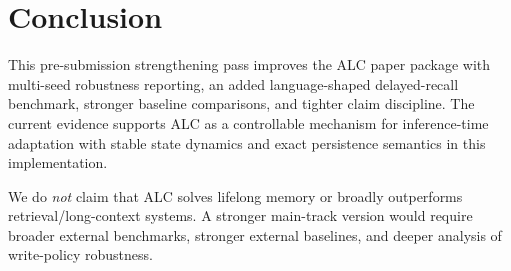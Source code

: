 \section{Conclusion}
This pre-submission strengthening pass improves the ALC paper package with multi-seed robustness reporting, an added language-shaped delayed-recall benchmark, stronger baseline comparisons, and tighter claim discipline. The current evidence supports ALC as a controllable mechanism for inference-time adaptation with stable state dynamics and exact persistence semantics in this implementation.

We do \emph{not} claim that ALC solves lifelong memory or broadly outperforms retrieval/long-context systems. A stronger main-track version would require broader external benchmarks, stronger external baselines, and deeper analysis of write-policy robustness.
